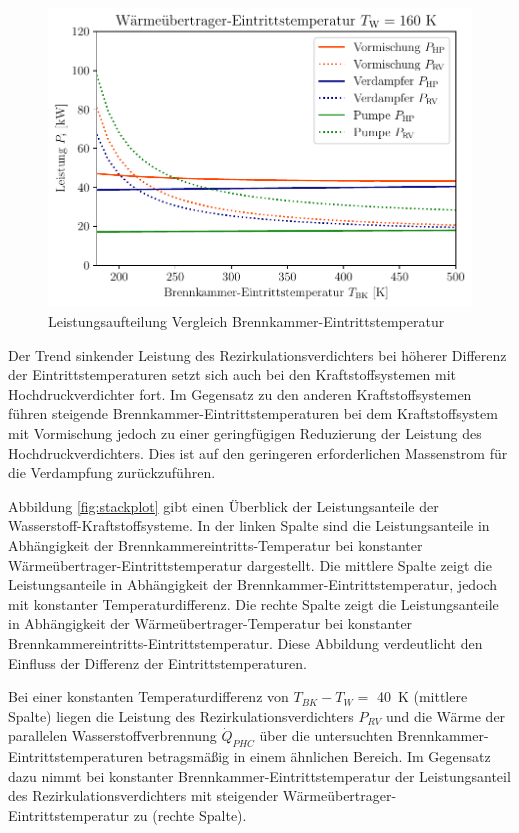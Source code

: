 \begin{figure}[ht]
\centering
\includegraphics[width=0.9\linewidth]{4_Abbildungen/2_Hauptteil/Ergebnisse/tbkcomp.pdf}
  \caption{Leistungsaufteilung Vergleich Brennkammer-Eintrittstemperatur}
  \label{fig:tbk_split}
\end{figure}
\FloatBarrier

Der Trend sinkender Leistung des Rezirkulationsverdichters bei höherer Differenz der Eintrittstemperaturen setzt sich auch bei den Kraftstoffsystemen mit Hochdruckverdichter fort. Im Gegensatz zu den anderen Kraftstoffsystemen führen steigende Brennkammer-Eintrittstemperaturen bei dem Kraftstoffsystem mit Vormischung jedoch zu einer geringfügigen Reduzierung der Leistung des Hochdruckverdichters. Dies ist auf den geringeren erforderlichen Massenstrom für die Verdampfung zurückzuführen. 

Abbildung \ref{fig:stackplot} gibt einen Überblick der Leistungsanteile der Wasserstoff-Kraftstoffsysteme. In der linken Spalte sind die Leistungsanteile in Abhängigkeit der Brennkammereintritts-Temperatur bei konstanter Wärmeübertrager-Eintrittstemperatur dargestellt. Die mittlere Spalte zeigt die Leistungsanteile in Abhängigkeit der Brennkammer-Eintrittstemperatur, jedoch mit konstanter Temperaturdifferenz. Die rechte Spalte zeigt die Leistungsanteile in Abhängigkeit der Wärmeübertrager-Temperatur bei konstanter Brennkammereintritts-Eintrittstemperatur. Diese Abbildung verdeutlicht den Einfluss der Differenz der Eintrittstemperaturen. 

Bei einer konstanten Temperaturdifferenz von $T_{BK}-T_W=$ \SI{40}{\K} (mittlere Spalte) liegen die Leistung des Rezirkulationsverdichters $P_{RV}$ und die Wärme der parallelen Wasserstoffverbrennung $\dot{Q}_{PHC}$ über die untersuchten Brennkammer-Eintrittstemperaturen betragsmäßig in einem ähnlichen Bereich. Im Gegensatz dazu nimmt bei konstanter Brennkammer-Eintrittstemperatur der Leistungsanteil des Rezirkulationsverdichters mit steigender Wärmeübertrager-Eintrittstemperatur zu (rechte Spalte).

